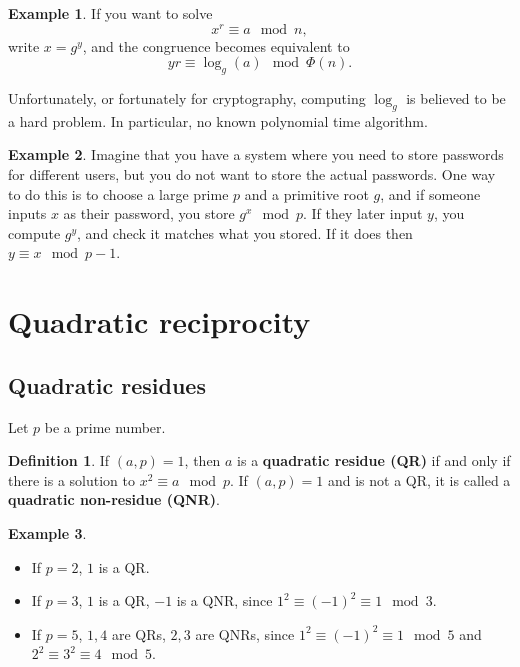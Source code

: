 \documentclass{article}
\newcommand{\rb}[1]{\left( #1 \right)}
\theoremstyle{definition}\newtheorem{definition}{Definition}
\theoremstyle{definition}\newtheorem{remark}[definition]{Remark}
\theoremstyle{definition}\newtheorem*{example}{Example}
\theoremstyle{definition}\newtheorem*{note}{Note}
\begin{document}
\begin{example}
If you want to solve
$$ x^r \equiv a \mod n, $$
write $ x = g^y $, and the congruence becomes equivalent to
$$ yr \equiv \log_g\rb{a} \mod \Phi\rb{n}. $$
\end{example}

Unfortunately, or fortunately for cryptography, computing $ \log_g $ is believed to be a hard problem. In particular, no known polynomial time algorithm.

\begin{example}
Imagine that you have a system where you need to store passwords for different users, but you do not want to store the actual passwords. One way to do this is to choose a large prime $ p $ and a primitive root $ g $, and if someone inputs $ x $ as their password, you store $ g^x \mod p $. If they later input $ y $, you compute $ g^y $, and check it matches what you stored. If it does then $ y \equiv x \mod p - 1 $.
\end{example}

\pagebreak

\section{Quadratic reciprocity}

\subsection{Quadratic residues}

Let $ p $ be a prime number.

\begin{definition}
If $ \rb{a, p} = 1 $, then $ a $ is a \textbf{quadratic residue (QR)} if and only if there is a solution to $ x^2 \equiv a \mod p $. If $ \rb{a, p} = 1 $ and is not a QR, it is called a \textbf{quadratic non-residue (QNR)}.
\end{definition}

\begin{example}
\hfill
\begin{itemize}
\item If $ p = 2 $, $ 1 $ is a QR.
\item If $ p = 3 $, $ 1 $ is a QR, $ -1 $ is a QNR, since $ 1^2 \equiv \rb{-1}^2 \equiv 1 \mod 3 $.
\item If $ p = 5 $, $ 1, 4 $ are QRs, $ 2, 3 $ are QNRs, since $ 1^2 \equiv \rb{-1}^2 \equiv 1 \mod 5 $ and $ 2^2 \equiv 3^2 \equiv 4 \mod 5 $.
\end{itemize}
\end{example}
\end{document}
